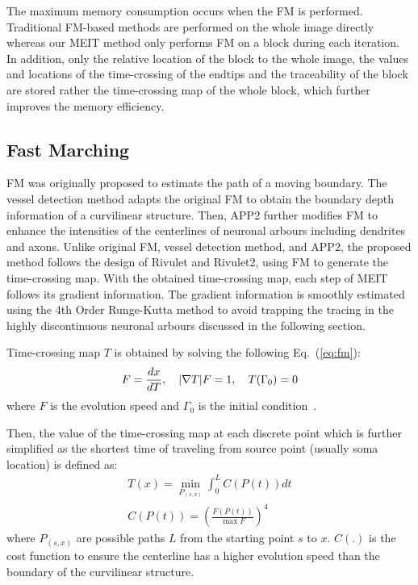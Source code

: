 \documentclass[conference]{IEEEtran}
\begin{document}
The maximum memory consumption occurs when the FM is performed. Traditional FM-based methods \cite{app, app2, r1_2, r2, fm-basu} are performed on the whole image directly whereas our MEIT method only performs FM on a block during each iteration. In addition, only the relative location of the block to the whole image, the values and locations of the time-crossing of the endtips and the traceability of the block are stored rather the time-crossing map of the whole block, which further improves the memory efficiency. 

\subsection{Fast Marching}
\label{ssec:fm}

FM was originally proposed to estimate the path of a moving boundary. The vessel detection method \cite{fm-vu} adapts the original FM to obtain the boundary depth information of a curvilinear structure. Then, APP2 further modifies FM to enhance the intensities of the centerlines of neuronal arbours including dendrites and axons. Unlike original FM, vessel detection method, and APP2, the proposed method follows the design of Rivulet and Rivulet2, using FM to generate the time-crossing map. With the obtained time-crossing map, each step of MEIT follows its gradient information. The gradient information is smoothly estimated using the 4th Order Runge-Kutta method to avoid trapping the tracing in the highly discontinuous neuronal arbours discussed in the following section.          

Time-crossing map $T$ is obtained by solving the following Eq.~(\ref{eq:fm}): 
\begin{eqnarray}
\vspace{-0.4cm}
F = \frac{dx}{dT},\quad |\nabla{T}|F = 1, \quad T(\Gamma_{0}) = 0 
\label{eq:fm}
\end{eqnarray}
where $F$ is the evolution speed and $\Gamma_{0}$ is the initial condition~\cite{adalsteinsson1995fast}.

Then, the value of the time-crossing map at each discrete point which is further simplified as the shortest time of traveling from source point (usually soma location) is defined as:  
\begin{eqnarray}
T(x) = \min_{P_{(s, x)}} \int_{0}^{L} C(P(t))dt \\
C(P(t)) = {\left(\frac{F(P(t))}{\max{F}}\right)}^{4} 
\label{eq:timecross}
\end{eqnarray}
where $P_{(s, x)}$ are possible paths $L$ from the starting point $s$ to $x$. $C(.)$ is the cost function to ensure the centerline has a higher evolution speed than the boundary of the curvilinear structure.  
\end{document}
